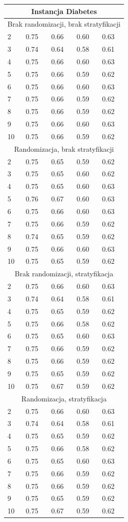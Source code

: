 \documentclass[12pt,a4paper]{article}
\begin{document}
\begin{tabular}{ |p{2.3cm}||p{2.5cm}|p{2.5cm}|p{2.5cm}|p{2.5cm}| }
\hline
\multicolumn{5}{|c|}{Instancja Diabetes}\\
\hline
\hline
\multicolumn{5}{|c|}{Brak randomizacji, brak stratyfikacji}\\
\hline
2&0.75& 0.66& 0.60& 0.63\\
3&0.74& 0.64& 0.58& 0.61\\
4&0.75& 0.66& 0.60& 0.63\\
5&0.75& 0.66& 0.59& 0.62\\
6&0.75& 0.66& 0.60& 0.63\\
7&0.75& 0.66& 0.59& 0.62\\
8&0.75& 0.66& 0.59& 0.62\\
9&0.75& 0.66& 0.60& 0.63\\
10&0.75& 0.66& 0.59& 0.62\\
\hline
\multicolumn{5}{|c|}{Randomizacja, brak stratyfikacji}\\
\hline
2&0.75& 0.65& 0.59& 0.62\\
3&0.75& 0.65& 0.60& 0.62\\
4&0.75& 0.65& 0.60& 0.63\\
5&0.76& 0.67& 0.60& 0.63\\
6&0.75& 0.66& 0.60& 0.63\\
7&0.75& 0.66& 0.59& 0.62\\
8&0.74& 0.65& 0.59& 0.62\\
9&0.75& 0.66& 0.60& 0.63\\
10&0.75& 0.65& 0.59& 0.62\\
\hline
\multicolumn{5}{|c|}{Brak randomizacji, stratyfikacja}\\
\hline
2&0.75& 0.66& 0.60& 0.63\\
3&0.74& 0.64& 0.58& 0.61\\
4&0.75& 0.65& 0.59& 0.62\\
5&0.75& 0.66& 0.58& 0.62\\
6&0.75& 0.65& 0.60& 0.63\\
7&0.75& 0.66& 0.59& 0.62\\
8&0.75& 0.66& 0.59& 0.62\\
9&0.75& 0.65& 0.59& 0.62\\
10&0.75& 0.67& 0.59& 0.62\\
\hline
\multicolumn{5}{|c|}{Randomizacja, stratyfikacja}\\
\hline
2&0.75& 0.66& 0.60& 0.63\\
3&0.74& 0.64& 0.58& 0.61\\
4&0.75& 0.65& 0.59& 0.62\\
5&0.75& 0.66& 0.58& 0.62\\
6&0.75& 0.65& 0.60& 0.63\\
7&0.75& 0.66& 0.59& 0.62\\
8&0.75& 0.66& 0.59& 0.62\\
9&0.75& 0.65& 0.59& 0.62\\
10&0.75& 0.67& 0.59& 0.62\\
 \hline
\end{tabular}
\vspace{5mm}
\end{document}
